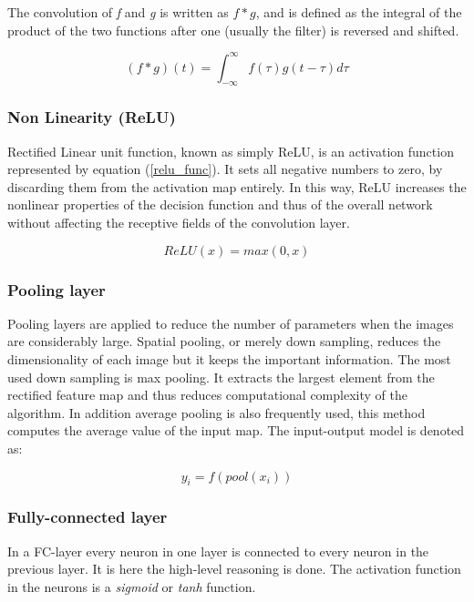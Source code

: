 \documentclass[thesis.tex]{subfiles}
\begin{document}
The convolution of \textit{f} and \textit{g} is written as $f*g$, and is defined as the integral of the product of the two functions after one (usually the filter) is reversed and shifted.

\begin{equation} %
  (f*g)(t) = \int_{-\infty}^{\infty} f(\tau) g(t-\tau) d\tau
  \label{convolution_func}
\end{equation}


\subsubsection{Non Linearity (ReLU)}
Rectified Linear unit function, known as simply ReLU, is an activation function represented by equation (\ref{relu_func}). It sets all negative numbers to zero, by discarding them from the activation map entirely. In this way, ReLU increases the nonlinear properties of the decision function and thus of the overall network without affecting the receptive fields of the convolution layer.

\begin{equation} %
    ReLU(x) = max(0, x)
    \label{relu_func}
\end{equation}


\subsubsection{Pooling layer}
Pooling layers are applied to reduce the number of parameters when the images are considerably large. Spatial pooling, or merely down sampling, reduces the dimensionality of each image but it keeps the important information. The most used down sampling is max pooling. It extracts the largest element from the rectified feature map and thus reduces computational complexity of the algorithm. In addition average pooling is also frequently used, this method computes the average value of the input map. The input-output model is denoted as:

\begin{equation} %
  y_i = f(pool(x_i))
  \label{pool_func}
\end{equation}


\subsubsection{Fully-connected layer}
In a FC-layer every neuron in one layer is connected to every neuron in the previous layer. It is here the high-level reasoning is done. The activation function in the neurons is a \textit{sigmoid} or \textit{tanh} function.
\end{document}
